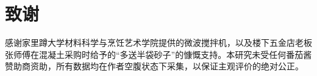 
\section*{致谢}

感谢家里蹲大学材料科学与烹饪艺术学院提供的微波搅拌机，以及楼下五金店老板张师傅在混凝土采购时给予的“多送半袋砂子”的慷慨支持。本研究未受任何番茄酱赞助商资助，所有数据均在作者空腹状态下采集，以保证主观评价的绝对公正。

\clearpage
